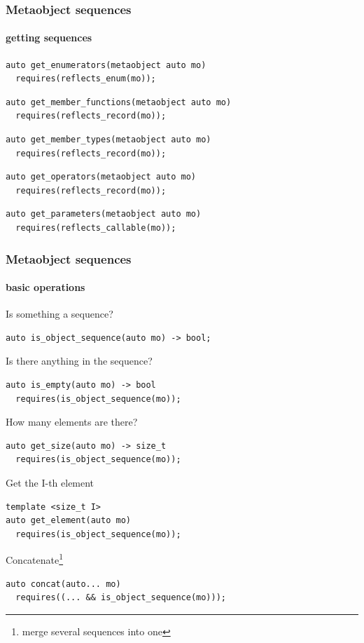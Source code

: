 \documentclass[compress,table,xcolor=table]{beamer}
\begin{document}
\begin{frame}[fragile]
  \frametitle{Metaobject sequences}
  \framesubtitle{getting sequences}
  \begin{lstlisting}[language=c++2x,basicstyle=\small\ttfamily]
auto get_enumerators(metaobject auto mo)
  requires(reflects_enum(mo));
  \end{lstlisting}
  \vfill
  \begin{lstlisting}[language=c++2x,basicstyle=\small\ttfamily]
auto get_member_functions(metaobject auto mo)
  requires(reflects_record(mo));
  \end{lstlisting}
  \vfill
  \begin{lstlisting}[language=c++2x,basicstyle=\small\ttfamily]
auto get_member_types(metaobject auto mo)
  requires(reflects_record(mo));
  \end{lstlisting}
  \vfill
  \begin{lstlisting}[language=c++2x,basicstyle=\small\ttfamily]
auto get_operators(metaobject auto mo)
  requires(reflects_record(mo));
  \end{lstlisting}
  \vfill
  \begin{lstlisting}[language=c++2x,basicstyle=\small\ttfamily]
auto get_parameters(metaobject auto mo)
  requires(reflects_callable(mo));
  \end{lstlisting}
\end{frame}
\begin{frame}[fragile]
  \frametitle{Metaobject sequences}
  \framesubtitle{basic operations}
  \smaller
  Is something a sequence?
  \begin{lstlisting}[language=c++2x,basicstyle=\small\ttfamily]
auto is_object_sequence(auto mo) -> bool;
  \end{lstlisting}
  \vfill
  Is there anything in the sequence?
  \begin{lstlisting}[language=c++2x,basicstyle=\footnotesize\ttfamily]
auto is_empty(auto mo) -> bool
  requires(is_object_sequence(mo));
  \end{lstlisting}
  \vfill
  How many elements are there?
  \begin{lstlisting}[language=c++2x,basicstyle=\footnotesize\ttfamily]
auto get_size(auto mo) -> size_t
  requires(is_object_sequence(mo));
  \end{lstlisting}
  \vfill
  Get the I-th element
  \begin{lstlisting}[language=c++2x,basicstyle=\footnotesize\ttfamily]
template <size_t I>
auto get_element(auto mo)
  requires(is_object_sequence(mo));
  \end{lstlisting}
  \vfill
  Concatenate\footnote{merge several sequences into one}
  \begin{lstlisting}[language=c++2x,basicstyle=\footnotesize\ttfamily]
auto concat(auto... mo)
  requires((... && is_object_sequence(mo)));
  \end{lstlisting}
\end{frame}
\end{document}
